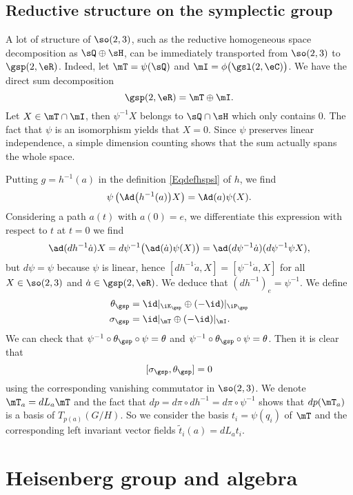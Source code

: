 \subsection{Reductive structure on the symplectic group}		\label{SubSecRedspT}

A lot of structure of $\so(2,3)$, such as the reductive homogeneous space decomposition as $\sQ\oplus\sH$, can be immediately transported from $\so(2,3)$ to $\gsp(2,\eR)$. Indeed, let $\mT=\psi(\sQ)$ and $\mI=\phi\big( \gsl(2,\eC) \big)$. We have the direct sum decomposition 
\[ 
\gsp(2,\eR)=\mT\oplus\mI.
\]
 Let $X\in\mT\cap\mI$, then $\psi^{-1}X$ belongs to $\sQ\cap\sH$ which only contains $0$. The fact that $\psi$ is an isomorphism yields that $X=0$. Since $\psi$ preserves linear independence, a simple dimension counting shows that the sum actually spans the whole space.

Putting $g=h^{-1}(a)$ in the definition \eqref{Eqdefhspsl} of $h$, we find
\[ 
  \psi\left( \Ad\big( h^{-1}(a) \big)X \right)=\Ad(a)\psi(X).
\]
Considering a path $a(t)$ with $a(0)=e$, we differentiate this expression with respect to $t$ at $t=0$ we find
\[ 
  \ad(dh^{-1}\dot a)X=d\psi^{-1}\big( \ad(\dot a)\psi(X) \big)=\ad(d\psi^{-1}\dot a)(d\psi^{-1}\psi X),
\]
but $d\psi=\psi$ because $\psi$ is linear, hence $[dh^{-1}\dot a,X]=[\psi^{-1}\dot a,X]$ for all $X\in \so(2,3)$ and $\dot a\in \gsp(2,\eR)$. We deduce that $(dh^{-1})_e=\psi^{-1}$. We define 
\begin{align*}
	\theta_{\gsp}&=\id|_{\iK_{\gsp}}\oplus(-\id)|_{\iP_{\gsp}}\\
	\sigma_{\gsp}&=\id|_{\mT}\oplus(-\id)|_{\mI}.
\end{align*}
We can check that $\psi^{-1}\circ\theta_{\gsp}\circ\psi=\theta$ and $\psi^{-1}\circ\theta_{\gsp}\circ\psi=\theta$. Then it is clear that
\[ 
  [\sigma_{\gsp},\theta_{\gsp}]=0
\]
using the corresponding vanishing commutator in $\so(2,3)$. We denote $\mT_a=dL_a\mT$ and the fact that $dp= d\pi\circ dh^{-1}= d\pi\circ \psi^{-1}$ shows that $dp(\mT_a)$ is a basis of $T_{p(a)}(G/H)$. So we consider the basis $t_i=\psi(q_i)$ of $\mT$ and the corresponding left invariant vector fields $\tilde t_i(a)=dL_at_i$.


\section{Heisenberg group and algebra}


